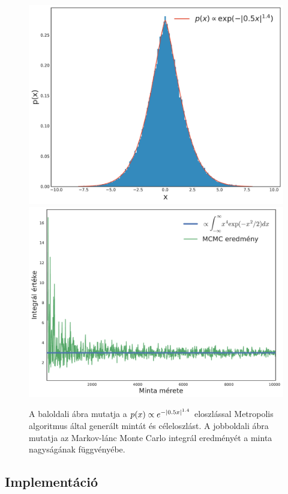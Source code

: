 \documentclass[10pt,a4paper]{article}
\numberwithin{equation}{subsection}
\numberwithin{figure}{section}
\begin{document}
\begin{figure}[H]
\centering
\includegraphics[scale=0.35]{pic/Coulomb/MCSamples.pdf}
\includegraphics[scale=0.33]{pic/Coulomb/MCMCInt.pdf}
\caption{A baloldali ábra mutatja a $p(x)\propto e^{-\abs{0.5x}^{1.4}}$ eloszlással Metropolis algoritmus által generált mintát és céleloszlást. A jobboldali ábra mutatja az Markov-lánc Monte Carlo integrál eredményét a minta nagyságának függvényébe. }
\label{fig:MCMC}
\end{figure}

\subsection{Implementáció}
\end{document}
